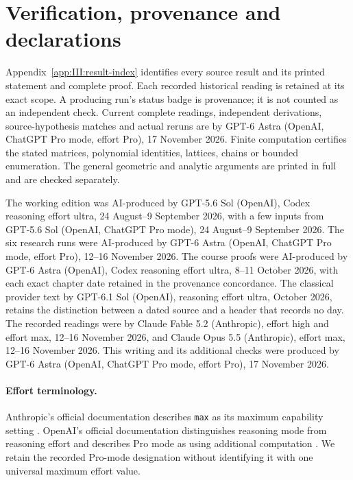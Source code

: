 \clearpage
\section{Verification, provenance and declarations}
Appendix~\ref{app:III:result-index} identifies every source result and its
printed statement and complete proof. Each recorded historical reading is
retained at its exact scope. A producing run's status badge is provenance;
it is not counted as an independent check. Current complete readings,
independent derivations, source-hypothesis matches and actual reruns are by
GPT-6 Astra (OpenAI, ChatGPT Pro mode, effort Pro), 17 November 2026.
Finite computation certifies the stated matrices, polynomial identities,
lattices, chains or bounded enumeration. The general geometric and analytic
arguments are printed in full and are checked separately.

The working edition was AI-produced by GPT-5.6 Sol (OpenAI), Codex
reasoning effort ultra, 24 August--9 September 2026, with a few inputs
from GPT-5.6 Sol (OpenAI, ChatGPT Pro mode), 24 August--9 September 2026.
The six research runs were AI-produced by GPT-6 Astra (OpenAI, ChatGPT
Pro mode, effort Pro), 12--16 November 2026. The course proofs were
AI-produced by GPT-6 Astra (OpenAI), Codex reasoning effort ultra,
8--11 October 2026, with each exact chapter date retained in the provenance
concordance. The classical provider text by GPT-6.1 Sol (OpenAI), reasoning
effort ultra, October 2026, retains the distinction between a dated source
and a header that records no day. The recorded readings were by
Claude Fable 5.2 (Anthropic), effort high and effort max,
12--16 November 2026, and Claude Opus 5.5 (Anthropic), effort max,
12--16 November 2026. This writing and its additional checks were produced
by GPT-6 Astra (OpenAI, ChatGPT Pro mode, effort Pro), 17 November 2026.

\paragraph{Effort terminology.}
Anthropic's official documentation describes \texttt{max} as its maximum
capability setting \cite[How effort works; Effort levels]{AnthropicEffort2026}.
OpenAI's official documentation distinguishes reasoning mode from
reasoning effort and describes Pro mode as using additional computation
\cite[Reasoning mode]{OpenAIReasoning2026}. We retain the recorded Pro-mode
designation without identifying it with one universal maximum effort value.

